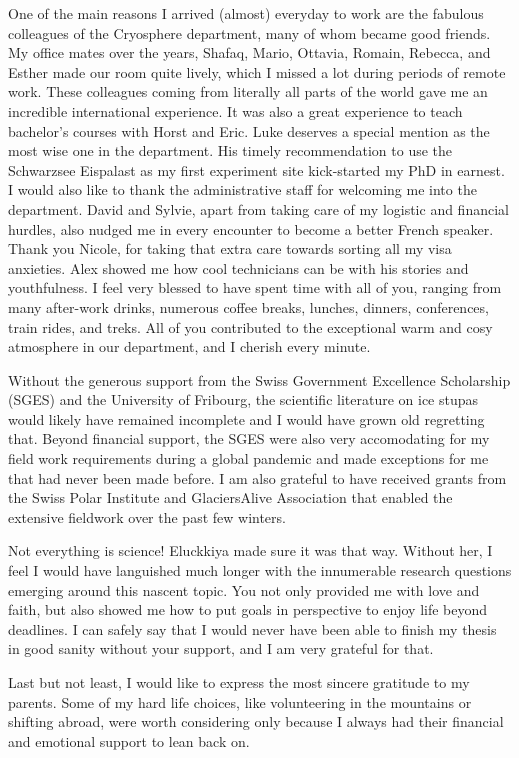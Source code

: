 One of the main reasons I arrived (almost) everyday to work are the fabulous colleagues of the Cryosphere
department, many of whom became good friends. My office mates over the years, Shafaq, Mario, Ottavia, Romain,
Rebecca, and Esther made our room quite lively, which I missed a lot during periods of remote work.
These colleagues coming from literally all parts of the world gave me an incredible international experience.
It was also a great experience to teach bachelor's courses with Horst and Eric. Luke deserves a special mention
as the most wise one in the department. His timely recommendation to use the Schwarzsee Eispalast as
my first experiment site kick-started my PhD in earnest. I would also like to thank the administrative staff for
welcoming me into the department. David and Sylvie, apart from taking care of my logistic and financial hurdles,
also nudged me in every encounter to become a better French speaker. Thank you Nicole, for taking that extra care towards
sorting all my visa anxieties. Alex showed me how cool technicians can be with his stories and youthfulness. I
feel very blessed to have spent time with all of you, ranging from many after-work drinks, numerous coffee
breaks, lunches, dinners, conferences, train rides, and treks. All of you contributed to the exceptional warm
and cosy atmosphere in our department, and I cherish every minute. 

Without the generous support from the Swiss Government Excellence Scholarship (SGES) and the University of
Fribourg, the scientific literature on ice stupas would likely have remained incomplete and I would have grown
old regretting that. Beyond financial support, the SGES were also very accomodating for my field work
requirements during a global pandemic and made exceptions for me that had never been made before. I am also
grateful to have received grants from the Swiss Polar Institute and GlaciersAlive Association that enabled the
extensive fieldwork over the past few winters. 

Not everything is science! Eluckkiya made sure it was that way. Without her, I feel I would have languished much
longer with the innumerable research questions emerging around this nascent topic. You not only provided me with
love and faith, but also showed me how to put goals in perspective to enjoy life beyond deadlines.
I can safely say that I would never have been able to finish my thesis in good sanity without your support, and
I am very grateful for that. 

Last but not least, I would like to express the most sincere gratitude to my parents. Some of my hard life
choices, like volunteering in the mountains or shifting abroad, were worth considering only because I always had
their financial and emotional support to lean back on.



